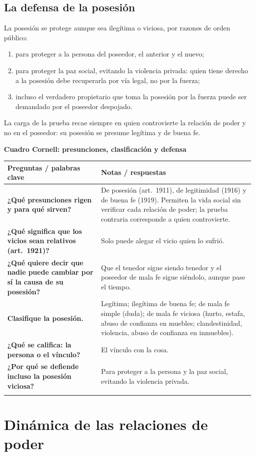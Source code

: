 \documentclass[12pt,oneside]{book}
\renewcommand{\arraystretch}{1.25}
\newcommand{\cq}[2]{\textbf{#1} & #2 \\[0.45em]}
\newcommand{\cornell}[3]{%
\par\bigskip\noindent\textbf{\large Cuadro Cornell: #1}\par\smallskip
\begin{center}
\small
\renewcommand{\arraystretch}{1.15}
\begin{tabularx}{\textwidth}{>{\raggedright\arraybackslash}p{0.27\textwidth}>{\raggedright\arraybackslash}X}
\toprule
\textbf{Preguntas / palabras clave} & \textbf{Notas / respuestas} \\
\midrule
#2
\midrule
\multicolumn{2}{p{\dimexpr\textwidth-2\tabcolsep\relax}}{\textbf{Resumen.} #3} \\
\bottomrule
\end{tabularx}
\end{center}
}
\begin{document}
\section{La defensa de la posesión}

La posesión se protege aunque sea ilegítima o viciosa, por razones de orden público:

\begin{enumerate}
    \item para proteger a la persona del poseedor, el anterior y el nuevo;
    \item para proteger la paz social, evitando la violencia privada: quien tiene derecho a la posesión debe recuperarla por vía legal, no por la fuerza;
    \item incluso el verdadero propietario que toma la posesión por la fuerza puede ser demandado por el poseedor despojado.
\end{enumerate}

La carga de la prueba recae siempre en quien controvierte la relación de poder y no en el poseedor: su posesión se presume legítima y de buena fe.

\cornell{presunciones, clasificación y defensa}{
\cq{¿Qué presunciones rigen y para qué sirven?}{De posesión (art.~1911), de legitimidad (1916) y de buena fe (1919). Permiten la vida social sin verificar cada relación de poder; la prueba contraria corresponde a quien controvierte.}
\cq{¿Qué significa que los vicios sean relativos (art.~1921)?}{Solo puede alegar el vicio quien lo sufrió.}
\cq{¿Qué quiere decir que nadie puede cambiar por sí la causa de su posesión?}{Que el tenedor sigue siendo tenedor y el poseedor de mala fe sigue siéndolo, aunque pase el tiempo.}
\cq{Clasifique la posesión.}{Legítima; ilegítima de buena fe; de mala fe simple (duda); de mala fe viciosa (hurto, estafa, abuso de confianza en muebles; clandestinidad, violencia, abuso de confianza en inmuebles).}
\cq{¿Qué se califica: la persona o el vínculo?}{El vínculo con la cosa.}
\cq{¿Por qué se defiende incluso la posesión viciosa?}{Para proteger a la persona y la paz social, evitando la violencia privada.}
}{Las relaciones de poder se presumen posesión, legítima y de buena fe. La posesión se clasifica según su legitimidad y vicios; se califica el vínculo y no a la persona. Se protege incluso la posesión ilegítima para preservar la paz social.}

\chapter[Dinámica de las relaciones de poder]{Dinámica de las relaciones de poder}\label{cap:dinamica}
\end{document}
